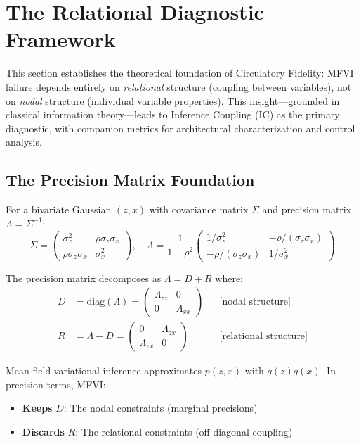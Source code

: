 \documentclass[10pt]{article} %
\theoremstyle{plain}
\theoremstyle{definition}
\begin{document}
\section{The Relational Diagnostic Framework}
\label{sec:definition}

This section establishes the theoretical foundation of Circulatory Fidelity: MFVI failure depends entirely on \emph{relational} structure (coupling between variables), not on \emph{nodal} structure (individual variable properties). This insight---grounded in classical information theory---leads to Inference Coupling (IC) as the primary diagnostic, with companion metrics for architectural characterization and control analysis.

\subsection{The Precision Matrix Foundation}
\label{sec:precision}

For a bivariate Gaussian $(z, x)$ with covariance matrix $\Sigma$ and precision matrix $\Lambda = \Sigma^{-1}$:
\begin{equation}
\Sigma = \begin{pmatrix} \sigma_z^2 & \rho\sigma_z\sigma_x \\ \rho\sigma_z\sigma_x & \sigma_x^2 \end{pmatrix}, \quad
\Lambda = \frac{1}{1-\rho^2}\begin{pmatrix} 1/\sigma_z^2 & -\rho/(\sigma_z\sigma_x) \\ -\rho/(\sigma_z\sigma_x) & 1/\sigma_x^2 \end{pmatrix}
\end{equation}

The precision matrix decomposes as $\Lambda = D + R$ where:
\begin{align}
D &= \text{diag}(\Lambda) = \begin{pmatrix} \Lambda_{zz} & 0 \\ 0 & \Lambda_{xx} \end{pmatrix} && \text{[nodal structure]} \\
R &= \Lambda - D = \begin{pmatrix} 0 & \Lambda_{zx} \\ \Lambda_{zx} & 0 \end{pmatrix} && \text{[relational structure]}
\end{align}

Mean-field variational inference approximates $p(z,x)$ with $q(z)q(x)$. In precision terms, MFVI:
\begin{itemize}
    \item \textbf{Keeps} $D$: The nodal constraints (marginal precisions)
    \item \textbf{Discards} $R$: The relational constraints (off-diagonal coupling)
\end{itemize}
\end{document}
